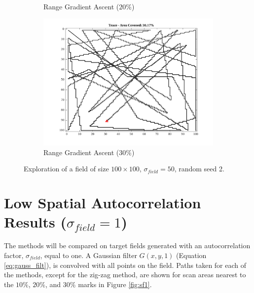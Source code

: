 \begin{figure}[htb!]
\begin{subfigure}[t]{0.32\textwidth}
        \ssp
        \captionsetup{skip=0.20\baselineskip,size=footnotesize}
        \caption{Range Gradient Ascent ($20\%$)}
    \end{subfigure}%
    \begin{subfigure}[t]{0.32\textwidth}
        \centering
        \includegraphics[width=\linewidth]{figures/hbresults/path_gr_30p_100x100_sf_50_seed_2.png}
        \ssp
        \captionsetup{skip=0.20\baselineskip,size=footnotesize}
        \caption{Range Gradient Ascent ($30\%$)}
    \end{subfigure}%
    \ssp
    \captionsetup{skip=0.20\baselineskip}
    \caption{Exploration of a field of size $100 \times 100$, $\sigma_{field} = 50$, random seed 2.}
    \label{fig:sf50}
\end{figure}

\FloatBarrier
\clearpage

\section{Low Spatial Autocorrelation Results ($\sigma_{field} = 1$)} \label{sec:sigma1}

The methods will be compared on target fields generated with an autocorrelation factor, $\sigma_{field}$, equal to one. A Gaussian filter $G(x,y,1)$ (Equation \ref{eq:gauss_filt}), is convolved with all points on the field. Paths taken for each of the methods, except for the zig-zag method, are shown for scan areas nearest to the $10\%$, $20\%$, and $30\%$ marks in Figure \ref{fig:sf1}. \\\\

